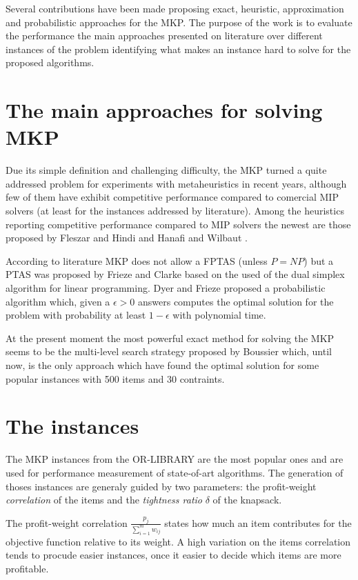 \documentclass{article}
\begin{document}
Several contributions have been made proposing exact, heuristic, approximation
and probabilistic approaches for the MKP.
The purpose of the work is to evaluate the performance the main approaches
presented on literature over different instances of the problem
identifying what makes an instance hard to solve for the proposed algorithms.

\section{The main approaches for solving MKP}
\label{algs}
Due its simple definition and challenging difficulty, the MKP
turned a quite addressed problem for experiments with metaheuristics in recent
years, although few of them have exhibit competitive performance compared to
comercial MIP solvers (at least for the instances addressed by literature).
Among the heuristics reporting competitive performance compared to MIP solvers
the newest are those proposed by Fleszar and Hindi \cite{fleszar2009fast}
and Hanafi and Wilbaut \cite{hanafi2011improved}.

According to literature MKP does not allow a FPTAS (unless $P=NP$) but a PTAS
was proposed by Frieze and Clarke \cite{frieze1984approximation} based on the
used of the dual simplex algorithm for linear programming.
Dyer and Frieze \cite{dyer1989probabilistic} proposed a probabilistic algorithm
which, given a $\epsilon > 0$ answers computes the optimal solution for the
problem with probability at least $1 - \epsilon$ with polynomial time.

At the present moment the most powerful exact method for solving the MKP seems
to be the multi-level search strategy proposed by Boussier \cite{boussier2010multi}
which, until now, is the only approach which have found the optimal solution for
some popular instances with 500 items and 30 contraints.

\section{The instances}
\label{insts}

The MKP instances from the OR-LIBRARY are the most popular ones and are used
for performance measurement of state-of-art algorithms.
The generation of thoses instances are generaly guided by two parameters: the
profit-weight {\it correlation} of the items and the {\it tightness ratio}
$\delta$ of the knapsack.

The profit-weight correlation $\frac{p_j}{\sum^m_{i=1}w_{ij}}$ states how much
an item contributes for the objective function relative to its weight.
A high variation on the items correlation tends to procude easier instances, once
it easier to decide which items are more profitable.
\end{document}
